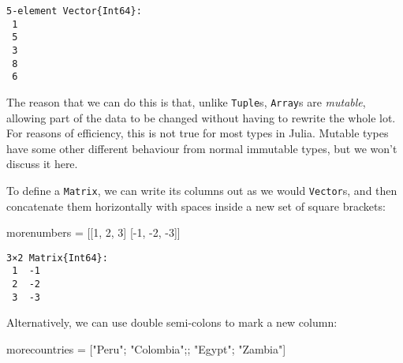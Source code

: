 \documentclass[
  letterpaper,
  DIV=11,
  numbers=noendperiod]{scrreprt}
\newenvironment{Shaded}{\begin{snugshade}}{\end{snugshade}}
\newcommand{\FloatTok}[1]{\textcolor[rgb]{0.68,0.00,0.00}{#1}}
\newcommand{\NormalTok}[1]{\textcolor[rgb]{0.00,0.23,0.31}{#1}}
\newcommand{\OperatorTok}[1]{\textcolor[rgb]{0.37,0.37,0.37}{#1}}
\newcommand{\StringTok}[1]{\textcolor[rgb]{0.13,0.47,0.30}{#1}}
\begin{document}
\begin{verbatim}
5-element Vector{Int64}:
 1
 5
 3
 8
 6
\end{verbatim}

\begin{tcolorbox}[enhanced jigsaw, toprule=.15mm, opacitybacktitle=0.6, leftrule=.75mm, breakable, coltitle=black, bottomrule=.15mm, colbacktitle=quarto-callout-note-color!10!white, bottomtitle=1mm, rightrule=.15mm, title=\textcolor{quarto-callout-note-color}{\faInfo}\hspace{0.5em}{Note}, colframe=quarto-callout-note-color-frame, left=2mm, colback=white, opacityback=0, arc=.35mm, toptitle=1mm, titlerule=0mm]

The reason that we can do this is that, unlike \texttt{Tuple}s,
\texttt{Array}s are \emph{mutable}, allowing part of the data to be
changed without having to rewrite the whole lot. For reasons of
efficiency, this is not true for most types in Julia. Mutable types have
some other different behaviour from normal immutable types, but we won't
discuss it here.

\end{tcolorbox}

To define a \texttt{Matrix}, we can write its columns out as we would
\texttt{Vector}s, and then concatenate them horizontally with spaces
inside a new set of square brackets:

\begin{Shaded}
\begin{Highlighting}[]
\NormalTok{morenumbers }\OperatorTok{=}\NormalTok{ [[}\FloatTok{1}\NormalTok{, }\FloatTok{2}\NormalTok{, }\FloatTok{3}\NormalTok{] [}\OperatorTok{{-}}\FloatTok{1}\NormalTok{, }\OperatorTok{{-}}\FloatTok{2}\NormalTok{, }\OperatorTok{{-}}\FloatTok{3}\NormalTok{]]}
\end{Highlighting}
\end{Shaded}

\begin{verbatim}
3×2 Matrix{Int64}:
 1  -1
 2  -2
 3  -3
\end{verbatim}

Alternatively, we can use double semi-colons to mark a new column:

\begin{Shaded}
\begin{Highlighting}[]
\NormalTok{morecountries }\OperatorTok{=}\NormalTok{ [}\StringTok{"Peru"}\NormalTok{; }\StringTok{"Colombia"}\NormalTok{;; }\StringTok{"Egypt"}\NormalTok{; }\StringTok{"Zambia"}\NormalTok{]}
\end{Highlighting}
\end{Shaded}
\end{document}
